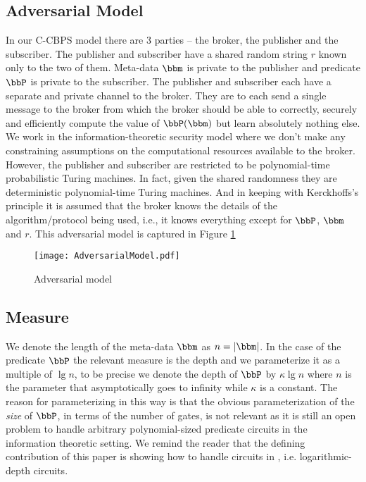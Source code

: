 \subsection{Adversarial Model}
In our C-CBPS  model there are 3 parties --  the broker, the publisher
and the subscriber.  The publisher and subscriber have a shared random
string $r$ known only to the  two of them. Meta-data $\bbm$ is private
to the  publisher and predicate  $\bbP$ is private to  the subscriber.
The publisher and subscriber each  have a separate and private channel
to the  broker. They are to each  send a single message  to the broker
from  which the  broker  should  be able  to  correctly, securely  and
efficiently  compute the  value of  $\bbP(\bbm)$ but  learn absolutely
nothing  else. We  work  in the  information-theoretic security  model
where we don't make  any constraining assumptions on the computational
resources  available  to  the  broker.   However,  the  publisher  and
subscriber are  restricted to be  polynomial-time probabilistic Turing
machines. In fact, given  the shared randomness they are deterministic
polynomial-time  Turing  machines. And  in  keeping with  Kerckhoffs's
principle \cite{Kerckhoff1883} it is assumed that the broker knows the
details  of   the  algorithm/protocol  being  used,   i.e.,  it  knows
everything except for $\bbP$,  $\bbm$ and $r$.  This adversarial model
is captured in Figure \ref{fig:adversarialmodel}

\begin{figure}
\centering
\texttt{[image: AdversarialModel.pdf]}
\vspace{-.5in}
\caption{Adversarial model}
\label{fig:adversarialmodel}
\end{figure}

\subsection{Measure}
We denote the  length of the meta-data $\bbm$ as $n  = |\bbm|$. In the
case of the predicate $\bbP$ the  relevant measure is the depth and we
parameterize it as a multiple of  $\lg n$, to be precise we denote the
depth  of $\bbP$  by $\kappa\lg  n$ where  $n$ is  the  parameter that
asymptotically  goes to  infinity while  $\kappa$ is  a  constant. The
reason   for  parameterizing  in   this  way   is  that   the  obvious
parameterization of the  {\em size} of $\bbP$, in  terms of the number
of gates,  is not relevant  as it is  still an open problem  to handle
arbitrary  polynomial-sized  predicate  circuits  in  the  information
theoretic setting. We remind the reader that the defining contribution
of  this  paper   is  showing  how  to  handle   circuits  in  \NCone,
i.e. logarithmic-depth circuits.

